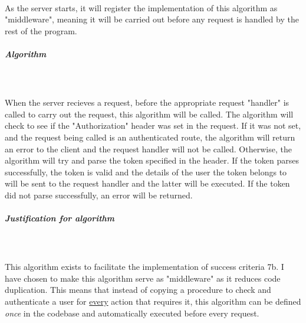 \documentclass[../../main.tex]{subfiles}
\begin{document}
\noindent \\ As the server starts, it will register the implementation of this algorithm as "middleware", meaning
it will be carried out before any request is handled by the rest of the program.

\subparagraph{Algorithm}

\noindent \\\\ When the server recieves a request, before the appropriate request "handler" is called to carry
out the request, this algorithm will be called. The algorithm will check to see if the "Authorization" header
was set in the request. If it was not set, and the request being called is an authenticated route, the
algorithm will return an error to the client and the request handler will not be called. Otherwise, the algorithm
will try and parse the token specified in the header. If the token parses successfully, the token is valid and the
details of the user the token belongs to will be sent to the request handler and the latter will be executed.
If the token did not parse successfully, an error will be returned.


\subparagraph{Justification for algorithm}

\noindent \\\\ This algorithm exists to facilitate the implementation of success criteria 7b. I have chosen
to make this algorithm serve as "middleware" as it reduces code duplication. This means that instead of copying
a procedure to check and authenticate a user for \underline{every} action that requires it, this algorithm
can be defined \textit{once} in the codebase and automatically executed before every request.
\end{document}

